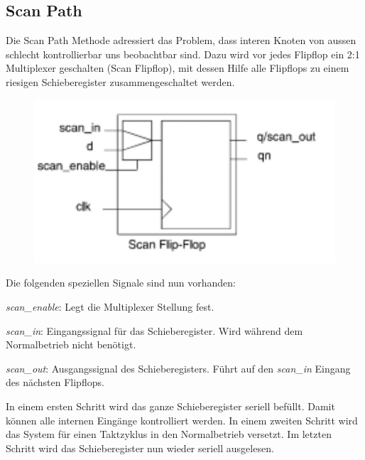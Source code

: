 \subsection{Scan Path}
Die Scan Path Methode adressiert das Problem, dass interen Knoten von aussen schlecht kontrollierbar uns beobachtbar sind. Dazu wird vor jedes Flipflop ein 2:1 Multiplexer geschalten (Scan Flipflop), mit dessen Hilfe alle Flipflops zu einem riesigen Schieberegister zusammengeschaltet werden. \\
\begin{minipage}{0.25\textwidth}
\begin{figure}[H]
    \includegraphics[width=1.0\textwidth]{images/scanflipflop.png}
\end{figure}
\end{minipage}
\hfill
\begin{minipage}{0.7\textwidth}
Die folgenden speziellen Signale sind nun vorhanden:
\begin{compactitem}
    \item \textit{scan\_enable}: Legt die Multiplexer Stellung fest.
    \item \textit{scan\_in}: Eingangssignal für das Schieberegister. Wird während dem Normalbetrieb nicht benötigt. 
    \item \textit{scan\_out}: Ausgangssignal des Schieberegisters. Führt auf den \textit{scan\_in} Eingang des nächsten Flipflops.
\end{compactitem}
\end{minipage}

In einem ersten Schritt wird das ganze Schieberegister seriell befüllt. Damit können alle internen Eingänge kontrolliert werden. In einem zweiten Schritt wird das System für einen Taktzyklus in den Normalbetrieb versetzt. Im letzten Schritt wird das Schieberegister nun wieder seriell ausgelesen.


